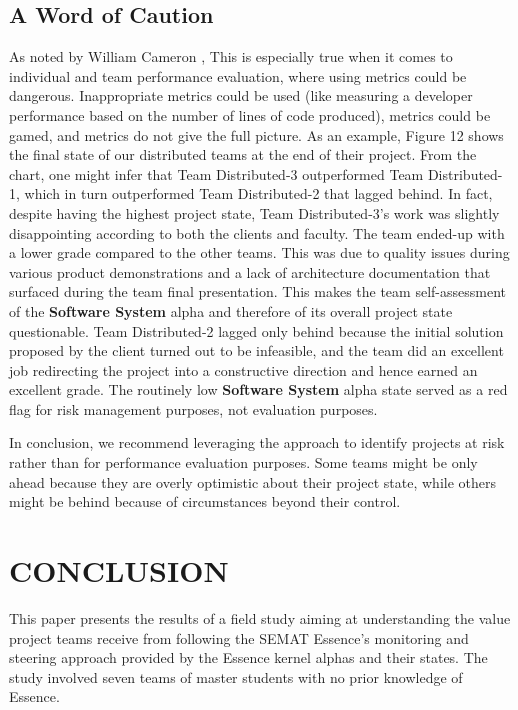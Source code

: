 \subsection{A Word of Caution}
As noted by William Cameron \cite{CameronSociologicalThinking},  This is especially true when it comes to individual and team performance evaluation, where using metrics could be dangerous. Inappropriate metrics could be used (like measuring a developer performance based on the number of lines of code produced), metrics could be gamed, and metrics do not give the full picture.
As an example, Figure 12 shows the final state of our distributed teams at the end of their project. From the chart, one might infer that Team Distributed-3 outperformed Team Distributed-1, which in turn outperformed Team Distributed-2 that lagged behind. In fact, despite having the highest project state, Team Distributed-3's work was slightly disappointing according to both the clients and faculty. The team ended-up with a lower grade compared to the other teams. This was due to quality issues during various product demonstrations and a lack of architecture documentation that surfaced during the team final presentation. This makes the team self-assessment of the \textbf{Software System} alpha and therefore of its overall project state questionable. Team Distributed-2 lagged only behind because the initial solution proposed by the client turned out to be infeasible, and the team did an excellent job redirecting the project into a constructive direction and hence earned an excellent grade. The routinely low \textbf{Software System} alpha state served as a red flag for risk management purposes, not evaluation purposes.

In conclusion, we recommend leveraging the approach to identify projects at risk rather than for performance evaluation purposes. Some teams might be only ahead because they are overly optimistic about their project state, while others might be behind because of circumstances beyond their control.

\section{CONCLUSION}
This paper presents the results of a field study aiming at understanding the value project teams receive from following the SEMAT Essence's monitoring and steering approach provided by the Essence kernel alphas and their states. The study involved seven teams of master students with no prior knowledge of Essence.

